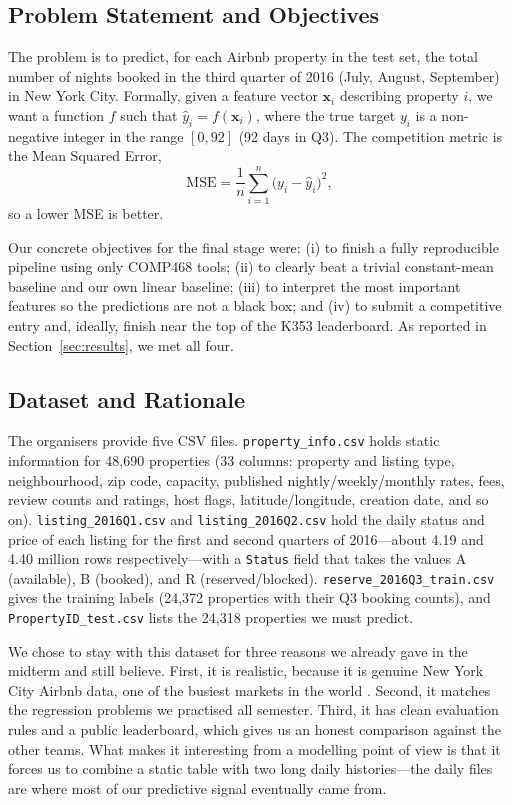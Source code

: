 \documentclass[journal]{IEEEtran}
\begin{document}
\subsection{Problem Statement and Objectives}
The problem is to predict, for each Airbnb property in the test set, the total
number of nights booked in the third quarter of 2016 (July, August, September)
in New York City. Formally, given a feature vector $\mathbf{x}_i$ describing
property $i$, we want a function $f$ such that
$\hat y_i = f(\mathbf{x}_i)$, where the true target $y_i$ is a non-negative
integer in the range $[0,92]$ (92 days in Q3). The competition metric is the
Mean Squared Error,
\begin{equation}
\text{MSE} = \frac{1}{n}\sum_{i=1}^{n}\big(y_i-\hat y_i\big)^{2},
\label{eq:mse}
\end{equation}
so a lower MSE is better.

Our concrete objectives for the final stage were: (i) to finish a fully
reproducible pipeline using only COMP468 tools; (ii) to clearly beat a trivial
constant-mean baseline and our own linear baseline; (iii) to interpret the most
important features so the predictions are not a black box; and (iv) to submit a
competitive entry and, ideally, finish near the top of the K353 leaderboard. As
reported in Section~\ref{sec:results}, we met all four.

\subsection{Dataset and Rationale}
The organisers provide five CSV files. \texttt{property\_info.csv} holds static
information for 48{,}690 properties (33 columns: property and listing type,
neighbourhood, zip code, capacity, published nightly/weekly/monthly rates, fees,
review counts and ratings, host flags, latitude/longitude, creation date, and so
on). \texttt{listing\_2016Q1.csv} and \texttt{listing\_2016Q2.csv} hold the
daily status and price of each listing for the first and second quarters of
2016---about 4.19 and 4.40 million rows respectively---with a \texttt{Status}
field that takes the values A (available), B (booked), and R (reserved/blocked).
\texttt{reserve\_2016Q3\_train.csv} gives the training labels (24{,}372
properties with their Q3 booking counts), and \texttt{PropertyID\_test.csv}
lists the 24{,}318 properties we must predict.

We chose to stay with this dataset for three reasons we already gave in the
midterm and still believe. First, it is realistic, because it is genuine New
York City Airbnb data, one of the busiest markets in the world
\cite{kalehbasti2019}. Second, it matches the regression problems we practised
all semester. Third, it has clean evaluation rules and a public leaderboard,
which gives us an honest comparison against the other teams. What makes it
interesting from a modelling point of view is that it forces us to combine a
static table with two long daily histories---the daily files are where most of
our predictive signal eventually came from.
\end{document}
